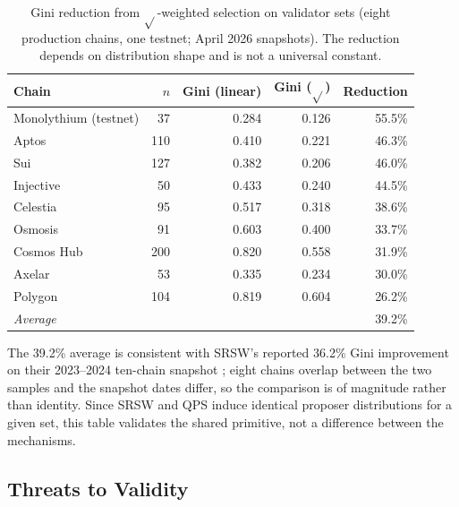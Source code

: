 \documentclass[11pt,a4paper]{article}
\begin{document}
\begin{table}[H]
\centering
\begin{tabular}{lrrrr}
\toprule
Chain & $n$ & Gini (linear) & Gini ($\sqrt{}$) & Reduction \\
\midrule
Monolythium (testnet) & 37 & 0.284 & 0.126 & 55.5\% \\
Aptos & 110 & 0.410 & 0.221 & 46.3\% \\
Sui & 127 & 0.382 & 0.206 & 46.0\% \\
Injective & 50 & 0.433 & 0.240 & 44.5\% \\
Celestia & 95 & 0.517 & 0.318 & 38.6\% \\
Osmosis & 91 & 0.603 & 0.400 & 33.7\% \\
Cosmos Hub & 200 & 0.820 & 0.558 & 31.9\% \\
Axelar & 53 & 0.335 & 0.234 & 30.0\% \\
Polygon & 104 & 0.819 & 0.604 & 26.2\% \\
\midrule
\textit{Average} & & & & 39.2\% \\
\bottomrule
\end{tabular}
\caption{Gini reduction from $\sqrt{}$-weighted selection on validator sets (eight production chains, one testnet; April 2026 snapshots). The reduction depends on distribution shape and is not a universal constant.}
\label{tab:crosschain}
\end{table}

The 39.2\% average is consistent with SRSW's reported 36.2\% Gini improvement on their 2023--2024 ten-chain snapshot \cite{srsw}; eight chains overlap between the two samples and the snapshot dates differ, so the comparison is of magnitude rather than identity. Since SRSW and QPS induce identical proposer distributions for a given set, this table validates the shared primitive, not a difference between the mechanisms.

\subsection{Threats to Validity}
\end{document}
